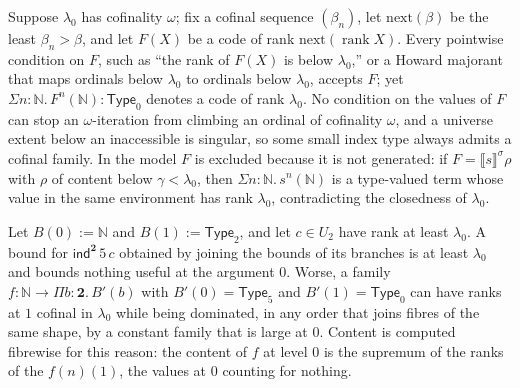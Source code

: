 \documentclass[10pt]{article}
\newcommand{\N}{\mathbb{N}}
\newcommand{\Type}{\mathsf{Type}}
\newcommand{\rk}{\operatorname{rank}}
\newcommand{\sem}[1]{\llbracket #1\rrbracket}
\begin{document}
\begin{example}\label{ex:climb}
Suppose $\lambda_0$ has cofinality $\omega$; fix a cofinal sequence
$(\beta_n)$, let $\mathrm{next}(\beta)$ be the least $\beta_n>\beta$, and
let $F(X)$ be a code of rank $\mathrm{next}(\rk X)$. Every pointwise
condition on $F$, such as ``the rank of $F(X)$ is below $\lambda_0$,'' or
a Howard majorant that maps ordinals below $\lambda_0$ to ordinals below
$\lambda_0$, accepts $F$; yet $\Sigma n{:}\N.\,F^n(\N):\Type_0$ denotes a
code of rank $\lambda_0$. No condition on the values of $F$ can stop an
$\omega$-iteration from climbing an ordinal of cofinality $\omega$, and
a universe extent below an inaccessible is singular, so some small index
type always admits a cofinal family. In the model $F$ is excluded
because it is not generated: if $F=\sem s^\sigma\rho$ with $\rho$ of
content below $\gamma<\lambda_0$, then $\Sigma n{:}\N.\,s^n(\N)$ is a
type-valued term whose value in the same environment has rank
$\lambda_0$, contradicting the closedness of $\lambda_0$.
\end{example}

\begin{example}\label{ex:hetero}
Let $B(0):=\N$ and $B(1):=\Type_2$, and let $c\in U_2$ have rank at least
$\lambda_0$. A bound for $\mathsf{ind}^{\mathbf 2}\,5\,c$ obtained by
joining the bounds of its branches is at least $\lambda_0$ and bounds
nothing useful at the argument $0$. Worse, a family
$f:\N\to\Pi b{:}\mathbf 2.\,B'(b)$ with $B'(0)=\Type_5$ and $B'(1)=\Type_0$
can have ranks at $1$ cofinal in $\lambda_0$ while being dominated, in
any order that joins fibres of the same shape, by a constant family that
is large at $0$. Content is computed fibrewise for this reason: the
content of $f$ at level $0$ is the supremum of the ranks of the
$f(n)(1)$, the values at $0$ counting for nothing.
\end{example}
\end{document}

